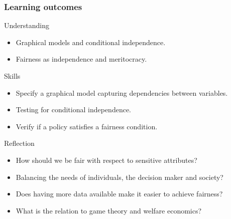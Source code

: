 \begin{frame}[squeeze]
  \frametitle{Learning outcomes}
  \begin{block}{Understanding}
    \begin{itemize}
    \item Graphical models and conditional independence.
    \item Fairness as independence and meritocracy.
    \end{itemize}
  \end{block}
  
  \begin{block}{Skills}
    \begin{itemize}
    \item Specify a graphical model capturing dependencies between variables.
    \item Testing for conditional independence.
    \item Verify if a policy satisfies a fairness condition.
    \end{itemize}
  \end{block}

  \begin{block}{Reflection}
    \begin{itemize}
    \item How should we be fair with respect to sensitive attributes?
    \item Balancing the needs of individuals, the decision maker and society?
    \item Does having more data available make it easier to achieve fairness?
    \item What is the relation to game theory and welfare economics?
    \end{itemize}
  \end{block}
  
\end{frame}





